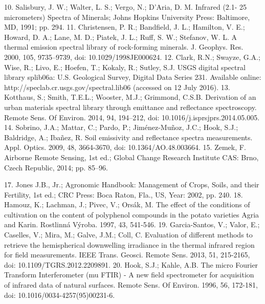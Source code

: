 10.	Salisbury, J. W.; Walter, L. S.; Vergo, N.; D'Aria, D. M. Infrared (2.1- 25 micrometers) Spectra of Minerals;  Johns Hopkins University Press: Baltimore, MD, 1991; pp. 294.
11.	Christensen, P. R.; Bandfield, J. L.; Hamilton, V. E.; Howard, D. A.; Lane, M. D.; Piatek, J. L.; Ruff, S. W.; Stefanov, W. L.  A thermal emission spectral library of rock-forming minerals. J. Geophys. Res. 2000, 105, 9735–9739, doi: 10.1029/1998JE000624.
12.	Clark, R.N.; Swayze, G.A.; Wise, R.; Livo, E.; Hoefen, T.; Kokaly, R.; Sutley, S.J. USGS digital spectral library splib06a: U.S. Geological Survey, Digital Data Series 231. Available online: http://speclab.cr.usgs.gov/spectral.lib06 (accessed on 12 July 2016).
13.	Kotthaus, S.; Smith, T.E.L.; Wooster, M.J.; Grimmond, C.S.B. Derivation of an urban materials spectral library through emittance and reflectance spectroscopy. Remote Sens. Of Environ. 2014, 94, 194–212, doi: 10.1016/j.isprsjprs.2014.05.005.
14.	Sobrino, J.A.; Mattar, C.; Pardo, P.; Jiménez-Muñoz, J.C.; Hook, S.J.; Baldridge, A.; Ibañez, R. Soil emissivity and reflectance spectra measurements. Appl. Optics. 2009, 48, 3664-3670, doi: 10.1364/AO.48.003664.
15.	Zemek, F. Airborne Remote Sensing, 1st ed.; Global Change Research Institute CAS: Brno, Czech Republic, 2014; pp. 85–96.

17.	Jones J.B., Jr.; Agronomic Handbook: Management of Crops, Soils, and their Fertility, 1st ed.; CRC Press: Boca Raton, Fla., US, Year: 2002, pp. 240.
18.	Hamouz, K.; Lachman, J.; Pivec, V.; Orsák, M. The effect of the conditions of cultivation on the content of polyphenol compounds in the potato varieties Agria and Karin. Rostlinná Výroba. 1997, 43, 541-546.
19.	Garcia-Santos, V.; Valor, E.; Caselles, V.; Mira, M.; Galve, J.M.; Coll, C. Evaluation of different methods to retrieve the hemispherical downwelling irradiance in the thermal infrared region for field measurements. IEEE Trans. Geosci. Remote Sens. 2013, 51, 215-2165, doi: 10.1109/TGRS.2012.2209891.
20.	Hook, S.J.; Kahle, A.B. The micro Fourier Transform Interferometer (mu FTIR) - A new field spectrometer for acquisition of infrared data of natural surfaces. Remote Sens. Of Environ. 1996, 56, 172-181, doi: 10.1016/0034-4257(95)00231-6.

